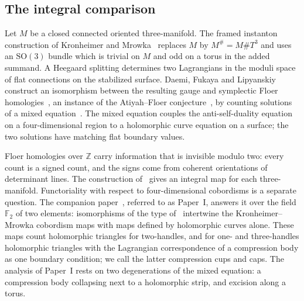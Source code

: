 \documentclass[11pt]{amsart}
\theoremstyle{definition}
\theoremstyle{remark}
\theoremstyle{plain}
\numberwithin{equation}{section}
\newcommand{\ZZ}{\mathbb Z}
\newcommand{\FF}{\mathbb F_2}
\newcommand{\SO}{\mathrm{SO}}
\begin{document}
\subsection{The integral comparison}
Let $M$ be a closed connected oriented three-manifold. The framed
instanton construction of Kronheimer and Mrowka~\cite[Section~4.1]{KM-instantons} replaces $M$ by
$M^\#=M\#T^3$ and uses an $\SO(3)$ bundle which is trivial on $M$ and odd on a torus in the added
summand. A Heegaard splitting determines two Lagrangians in the moduli space of flat connections on
the stabilized surface. Daemi, Fukaya and Lipyanskiy construct an isomorphism between the resulting
gauge and symplectic Floer homologies~\cite{Floer,Floer-Lagrangian}, an instance of the
Atiyah--Floer conjecture~\cite{Atiyah}, by counting solutions of a mixed equation~\cite{DFL}. The
mixed equation couples the anti-self-duality equation on a four-dimensional region to a holomorphic
curve equation on a surface; the two solutions have matching flat boundary values.

Floer homologies over $\ZZ$ carry information that is invisible modulo two: every count is a signed
count, and the signs come from coherent orientations of determinant lines. The construction
of~\cite{DFL} gives an integral map for each three-manifold. Functoriality with respect to
four-dimensional cobordisms is a separate question. The companion paper~\cite{PaperI}, referred to as
Paper~I, answers it over the field $\FF$ of two elements: isomorphisms of the type
of~\cite{DFL} intertwine the Kronheimer--Mrowka cobordism maps with maps defined by holomorphic
curves alone. These maps count holomorphic triangles for two-handles, and for one- and three-handles
holomorphic triangles with the Lagrangian correspondence of a compression body as one boundary
condition; we call the latter compression cups and caps. The analysis of Paper~I rests on two
degenerations of the mixed equation: a compression body collapsing next to a holomorphic strip, and
excision along a torus.
\end{document}
